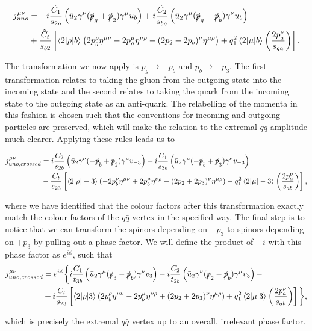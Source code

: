 \begin{equation}
\begin{split}
j_{uno}^{\mu \nu} &= -i \frac{\tilde{C}_1}{s_{2g}} \left(\bar{u}_2 \gamma^\nu (\slashed{p}_g + \slashed{p}_2) \gamma^\mu u_b \right) + i \frac{\tilde{C}_2}{s_{bg}} \left(\bar{u}_2 \gamma^\mu (\slashed{p}_g - \slashed{p}_b)\gamma^\nu u_b \right) \\
&+ \frac{\tilde{C}_t}{s_{b2}} \left[\mathinner{\langle2\vert\rho\vert b\rangle}_{} \left(2p_g^\rho \eta^{\mu \nu} - 2 p_g^\mu \eta^{\nu \rho} - (2p_2 - 2p_b)^\nu \eta^{\mu \rho} \right) + q_1^2 \mathinner{\langle2\vert\mu\vert b\rangle}_{} \left(\frac{2p_a^\nu}{s_{ga}} \right) \right].
\end{split}
\end{equation}

The transformation we now apply is $p_g \to -p_b$ and $p_b \to -p_3$. The first transformation relates to taking the gluon from the outgoing state into the incoming state and the second relates to taking the quark from the incoming state to the outgoing state as an anti-quark. The relabelling of the momenta in this fashion is chosen such that the conventions for incoming and outgoing particles are preserved, which will make the relation to the extremal $q\bar{q}$ amplitude much clearer. Applying these rules leads us to

\begin{equation}
\begin{split}
j_{uno, crossed}^{\mu \nu} &= i \frac{C_2}{s_{2b}} \left(\bar{u}_2 \gamma^\nu (-\slashed{p}_b + \slashed{p}_2) \gamma^\mu v_{-3} \right) - i \frac{C_1}{s_{3b}} \left(\bar{u}_2 \gamma^\mu (-\slashed{p}_b + \slashed{p}_3)\gamma^\nu v_{-3} \right) \\
&- \frac{C_t}{s_{23}} \left[\mathinner{\langle2\vert\rho\vert-3\rangle}_{} \left(-2p_b^\rho \eta^{\mu \nu} + 2 p_b^\mu \eta^{\nu \rho} - (2p_2 + 2p_3)^\nu \eta^{\mu \rho} \right) - q_1^2 \mathinner{\langle2\vert\mu\vert-3\rangle}_{} \left(\frac{2p_a^\nu}{s_{ab}} \right) \right],
\end{split}
\end{equation}

where we have identified that the colour factors after this transformation exactly match the colour factors of the $q\bar{q}$ vertex in the specified way. The final step is to notice that we can transform the spinors depending on $-p_3$ to spinors depending on $+p_3$ by pulling out a phase factor. We will define the product of $-i$ with this phase factor as $e^{i \phi}$, such that
\begin{equation}
\begin{split}
j_{uno, crossed}^{\mu \nu} &= e^{i\phi} \bigg \{ i \frac{C_1}{t_{3b}} \left(\bar{u}_2 \gamma^\mu (\slashed{p}_3 - \slashed{p}_b)\gamma^\nu v_3 \right) - i \frac{C_2}{t_{2b}} \left(\bar{u}_2 \gamma^\nu (\slashed{p}_2 - \slashed{p}_b) \gamma^\mu v_3 \right) -  \\
& +i \frac{C_t}{s_{23}} \left[\mathinner{\langle2\vert\rho\vert3\rangle}_{} \left(2p_b^\rho \eta^{\mu \nu} - 2 p_b^\mu \eta^{\nu \rho} + (2p_2 + 2p_3)^\nu \eta^{\mu \rho} \right) + q_1^2 \mathinner{\langle2\vert\mu\vert3\rangle}_{} \left(\frac{2p_a^\nu}{s_{ab}} \right) \right] \bigg \},
\end{split}
\end{equation}

which is precisely the extremal $q\bar{q}$ vertex up to an overall, irrelevant phase factor. 


